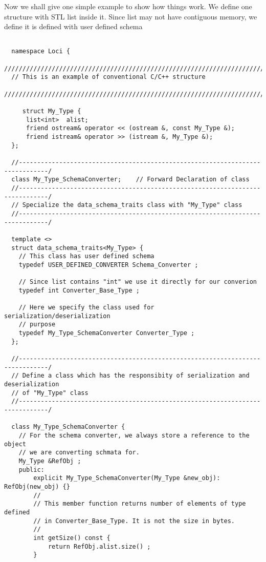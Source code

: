 %
Now we shall give one simple example to show how things work. We define
one structure with STL list inside it. Since list may not have contiguous
memory, we define it is defined with user defined schema
\begin{verbatim}

  namespace Loci {
  /////////////////////////////////////////////////////////////////////////////////
  // This is an example of conventional C/C++ structure 
  /////////////////////////////////////////////////////////////////////////////////

     struct My_Type {
      list<int>  alist;
      friend ostream& operator << (ostream &, const My_Type &);
      friend istream& operator >> (istream &, My_Type &);
  };

  //------------------------------------------------------------------------------/
  class My_Type_SchemaConverter;    // Forward Declaration of class
  //------------------------------------------------------------------------------/
  // Specialize the data_schema_traits class with "My_Type" class
  //------------------------------------------------------------------------------/

  template <>
  struct data_schema_traits<My_Type> {
    // This class has user defined schema
    typedef USER_DEFINED_CONVERTER Schema_Converter ;

    // Since list contains "int" we use it directly for our converion
    typedef int Converter_Base_Type ;
   
    // Here we specify the class used for serialization/deserialization 
    // purpose
    typedef My_Type_SchemaConverter Converter_Type ;
  };

  //------------------------------------------------------------------------------/
  // Define a class which has the responsibity of serialization and deserialization 
  // of "My_Type" class
  //------------------------------------------------------------------------------/

  class My_Type_SchemaConverter {
    // For the schema converter, we always store a reference to the object
    // we are converting schmata for.
    My_Type &RefObj ;
    public:
        explicit My_Type_SchemaConverter(My_Type &new_obj): RefObj(new_obj) {}
        //
        // This member function returns number of elements of type defined
        // in Converter_Base_Type. It is not the size in bytes.
        //
        int getSize() const {
            return RefObj.alist.size() ;
        }
      

\end{verbatim}
